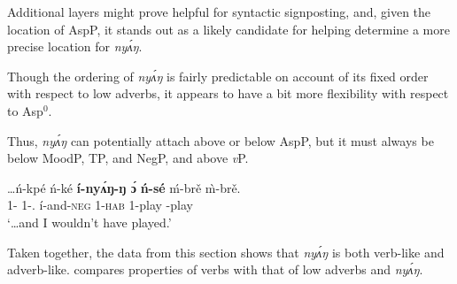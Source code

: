 \documentclass[output=paper,modfonts,nonflat,
]{langsci/langscibook}
\begin{document}
\noindent Additional layers might prove helpful for syntactic signposting, and, given the location of AspP, it stands out as a likely candidate for helping determine a more precise location for \textit{ny\'{ʌ}ŋ}.

Though the ordering of \textit{ny\'{ʌ}ŋ} is fairly predictable on account of its fixed order with respect to low adverbs, it appears to have a bit more flexibility with respect to Asp$^0$.

\ea\label{ex:duncan-et-al:24}
\z
\z

\noindent Thus, \textit{ny\'{ʌ}ŋ} can potentially attach above or below AspP, but it must always be below MoodP, TP, and NegP, and above \textit{v}P.

\ea\label{ex:duncan-et-al:25}
\gll \ldots ń-kpé ń-ké \textbf{í-ny\'{ʌ}ŋ-ŋ \'ɔ} \textbf{ń-sé} \'{m}-br\v{e} \`{m}-br\v{e}. \\
1{\SG-\COND} 1{\SG-\PST.\FOC} í-and-\textsc{neg} 1{\SG}-\textsc{hab} 1{\SG}-play {\NMLZ}-play \\
\glt `\ldots and I wouldn't have played.'
\z

Taken together, the data from this section shows that \textit{ny\'{ʌ}ŋ} is both verb-like and adverb-like.  compares properties of verbs with that of low adverbs and \textit{ny\'{ʌ}ŋ}.

\begin{table}
\caption{Properties of verbs, low adverbs, and \textit{ny\'{ʌ}ŋ}.}
\label{tab:2:properties}
\end{table}
\end{document}
